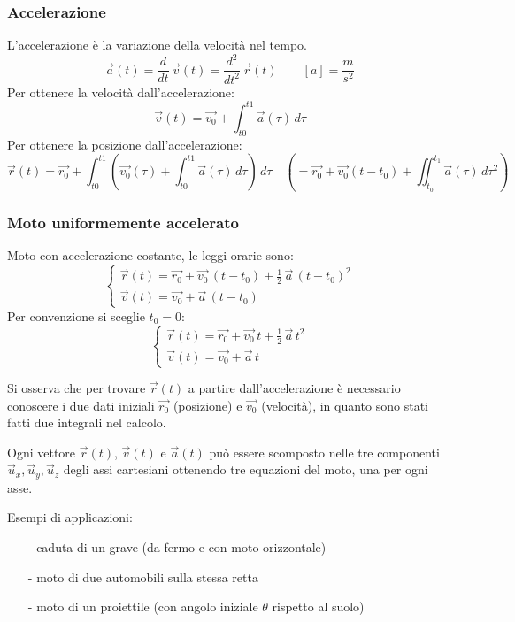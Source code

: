 \documentclass[a4paper]{article}
\newcommand\ux{\vec{u}_x}
\newcommand\uy{\vec{u}_y}
\newcommand\uz{\vec{u}_z}
\newcommand\dt{\frac{d}{dt}\,}
\begin{document}
\subsubsection*{Accelerazione}
L'accelerazione è la variazione della velocità nel tempo. \[\vec{a}(t) = \dt \vec{v}(t) = \frac{d^2}{dt^2} \, \vec{r}(t) \qquad \left[a\right] = \frac{m}{s^2}\]
Per ottenere la velocità dall'accelerazione: \[\vec{v}(t) = \vec{v_0} + \int_{t0}^{t1} \vec{a}(\tau) \, d\tau\]
Per ottenere la posizione dall'accelerazione: \[\vec{r}(t) = \vec{r_0} + \int_{t0}^{t1} \left( \vec{v_0}(\tau) + \int_{t0}^{t1} \vec{a}(\tau) \, d\tau \right) \, d\tau \quad \left(= \vec{r_0} + \vec{v_0}(t-t_0) + \iint_{t_0}^{t_1} \vec{a}(\tau) \, d\tau^2 \right)\]

\subsubsection*{Moto uniformemente accelerato}
Moto con accelerazione costante, le leggi orarie sono:
\[ \begin{cases}
	\vec{r}(t) = \vec{r_0} + \vec{v_0} \, (t-t_0) + \frac{1}{2} \, \vec{a} \,(t-t_0)^2 \\
	\vec{v}(t) = \vec{v_0} + \vec{a} \, (t-t_0)
\end{cases} \]
Per convenzione si sceglie \(t_0 = 0\):
\[ \begin{cases}
	\vec{r}(t) = \vec{r_0} + \vec{v_0} \, t + \frac{1}{2} \, \vec{a} \, t^2 \\
	\vec{v}(t) = \vec{v_0} + \vec{a} \, t
\end{cases} \]

Si osserva che per trovare \(\vec{r}(t)\) a partire dall'accelerazione è necessario conoscere i due dati iniziali \(\vec{r_0}\)
(posizione) e \(\vec{v_0}\) (velocità), in quanto sono stati fatti due integrali nel calcolo.

Ogni vettore \(\vec{r}(t)\), \(\vec{v}(t)\) e \(\vec{a}(t)\) può essere scomposto nelle tre componenti \(\ux, \uy, \uz\) degli assi cartesiani
ottenendo tre equazioni del moto, una per ogni asse.

Esempi di applicazioni:
\begin{itemize}
	\item[-] caduta di un grave (da fermo e con moto orizzontale)
	\item[-] moto di due automobili sulla stessa retta
	\item[-] moto di un proiettile (con angolo iniziale \(\theta\) rispetto al suolo)
\end{itemize}
\end{document}
